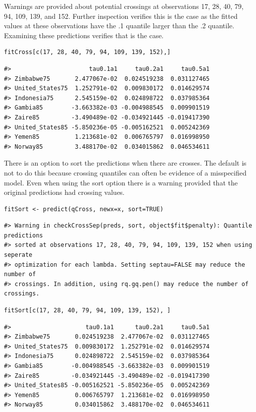 Warnings are provided about potential crossings at observations 17, 28, 40, 79, 94, 109, 139, and 152. Further inspection verifies this is the case as the fitted values at these observations have the .1 quantile larger than the .2 quantile. Examining these predictions verifies that is the case.

\begin{verbatim}
fitCross[c(17, 28, 40, 79, 94, 109, 139, 152),]
\end{verbatim}

\begin{verbatim}
#>                      tau0.1a1     tau0.2a1     tau0.5a1
#> Zimbabwe75       2.477067e-02  0.024519238  0.031127465
#> United_States75  1.252791e-02  0.009830172  0.014629574
#> Indonesia75      2.545159e-02  0.024898722  0.037985364
#> Gambia85        -3.663382e-03 -0.004988545  0.009901519
#> Zaire85         -3.490489e-02 -0.034921445 -0.019417390
#> United_States85 -5.850236e-05 -0.005162521  0.005242369
#> Yemen85          1.213681e-02  0.006765797  0.016998950
#> Norway85         3.488170e-02  0.034015862  0.046534611
\end{verbatim}

There is an option to sort the predictions when there are crosses. The default is not to do this because crossing quantiles can often be evidence of a misspecified model. Even when using the sort option there is a warning provided that the original predictions had crossing values.

\begin{verbatim}
fitSort <- predict(qCross, newx=x, sort=TRUE)
\end{verbatim}

\begin{verbatim}
#> Warning in checkCrossSep(preds, sort, object$fit$penalty): Quantile predictions
#> sorted at observations 17, 28, 40, 79, 94, 109, 139, 152 when using seperate
#> optimization for each lambda. Setting septau=FALSE may reduce the number of
#> crossings. In addition, using rq.gq.pen() may reduce the number of crossings.
\end{verbatim}

\begin{verbatim}
fitSort[c(17, 28, 40, 79, 94, 109, 139, 152), ]
\end{verbatim}

\begin{verbatim}
#>                     tau0.1a1      tau0.2a1     tau0.5a1
#> Zimbabwe75       0.024519238  2.477067e-02  0.031127465
#> United_States75  0.009830172  1.252791e-02  0.014629574
#> Indonesia75      0.024898722  2.545159e-02  0.037985364
#> Gambia85        -0.004988545 -3.663382e-03  0.009901519
#> Zaire85         -0.034921445 -3.490489e-02 -0.019417390
#> United_States85 -0.005162521 -5.850236e-05  0.005242369
#> Yemen85          0.006765797  1.213681e-02  0.016998950
#> Norway85         0.034015862  3.488170e-02  0.046534611
\end{verbatim}

